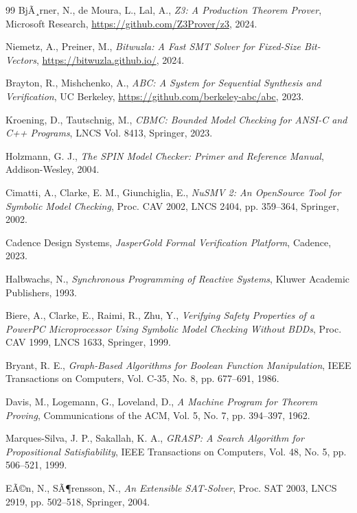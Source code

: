 ﻿\documentclass[12pt,a4paper]{report}
\begin{document}
\begin{thebibliography}{99}
  BjÃ¸rner, N., de Moura, L., Lal, A.,
  \textit{Z3: A Production Theorem Prover},
  Microsoft Research, \url{https://github.com/Z3Prover/z3}, 2024.

  Niemetz, A., Preiner, M.,
  \textit{Bitwuzla: A Fast SMT Solver for Fixed-Size Bit-Vectors},
  \url{https://bitwuzla.github.io/},
  2024.

  Brayton, R., Mishchenko, A.,
  \textit{ABC: A System for Sequential Synthesis and Verification},
  UC Berkeley, \url{https://github.com/berkeley-abc/abc}, 2023.

  Kroening, D., Tautschnig, M.,
  \textit{CBMC: Bounded Model Checking for ANSI-C and C++ Programs},
  LNCS Vol. 8413, Springer, 2023.

  Holzmann, G. J.,
  \textit{The SPIN Model Checker: Primer and Reference Manual},
  Addison-Wesley, 2004.

  Cimatti, A., Clarke, E. M., Giunchiglia, E.,
  \textit{NuSMV 2: An OpenSource Tool for Symbolic Model Checking},
  Proc. CAV 2002, LNCS 2404, pp. 359--364, Springer, 2002.

  Cadence Design Systems,
  \textit{JasperGold Formal Verification Platform},
  Cadence, 2023.

  Halbwachs, N.,
  \textit{Synchronous Programming of Reactive Systems},
  Kluwer Academic Publishers, 1993.

  Biere, A., Clarke, E., Raimi, R., Zhu, Y.,
  \textit{Verifying Safety Properties of a PowerPC Microprocessor Using Symbolic Model
  Checking Without BDDs},
  Proc. CAV 1999, LNCS 1633, Springer, 1999.

  Bryant, R. E.,
  \textit{Graph-Based Algorithms for Boolean Function Manipulation},
  IEEE Transactions on Computers, Vol. C-35, No. 8, pp. 677--691, 1986.

  Davis, M., Logemann, G., Loveland, D.,
  \textit{A Machine Program for Theorem Proving},
  Communications of the ACM, Vol. 5, No. 7, pp. 394--397, 1962.

  Marques-Silva, J. P., Sakallah, K. A.,
  \textit{GRASP: A Search Algorithm for Propositional Satisfiability},
  IEEE Transactions on Computers, Vol. 48, No. 5, pp. 506--521, 1999.

  EÃ©n, N., SÃ¶rensson, N.,
  \textit{An Extensible SAT-Solver},
  Proc. SAT 2003, LNCS 2919, pp. 502--518, Springer, 2004.


\end{thebibliography}
\end{document}
